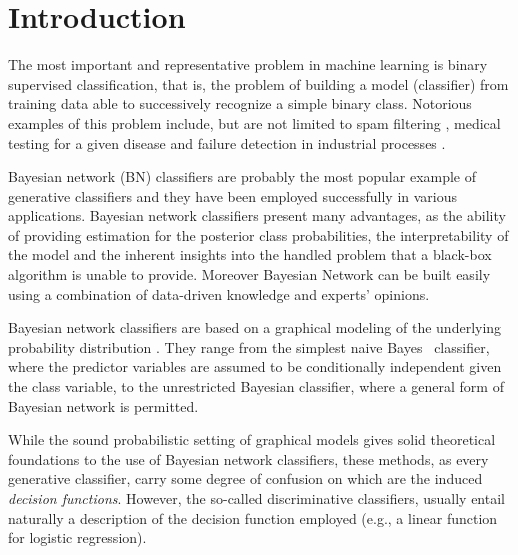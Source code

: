 \documentclass[11pt,a4paper, twoside]{book}
\begin{document}
 
\newpage
\cleardoublepage
\tableofcontents

\listoffigures

\listoftables
 
\cleardoublepage
\renewcommand{\headrulewidth}{1pt}


\mainmatter
\pagestyle{fancy}
\fancyhead[LE,RO]{\textsl{\MakeUppercase{\chaptername ~ \thechapter}}}
\fancyhead[LO,RE]{}
\fancyfoot[C]{\thepage}

\chapter{Introduction}

The most important and representative problem in machine learning is binary supervised classification, that is, the problem of building a model (classifier) from training data able to successively recognize a simple binary class.
Notorious examples of this problem include, but are not limited to spam filtering \citep{sahami1998}, medical testing for a given disease \citep{MORALES2013} and failure detection in industrial processes \citep{JUNG2018, varghese2015}.  

Bayesian network (BN) classifiers \citep{bielza2014} are probably the most popular example of generative classifiers and they have been employed successfully in various applications. 
Bayesian network classifiers present many advantages, as the ability of providing estimation for the posterior class probabilities, the interpretability of the  model and the inherent insights into the handled problem that a black-box algorithm is unable to provide. Moreover Bayesian Network can be built easily using a combination of data-driven knowledge and experts' opinions.

Bayesian network classifiers are based on a graphical modeling of the underlying probability distribution \citep{lauritzen1996, Pearl1988}. They range from the simplest naive Bayes~\citep{Minsky61stepstoward} classifier, where the predictor variables are assumed to be conditionally independent given the class variable, to the unrestricted Bayesian classifier, where a general form of Bayesian network \citep{Pearl1988} is permitted.

While the sound probabilistic setting of graphical models gives solid theoretical foundations to the use of Bayesian network classifiers, these methods, as every generative classifier, carry some degree of confusion on which are the induced \textit{decision functions}.
However, the so-called discriminative classifiers, usually entail naturally a description of the decision function employed (e.g., a linear function for logistic regression).
\end{document}

